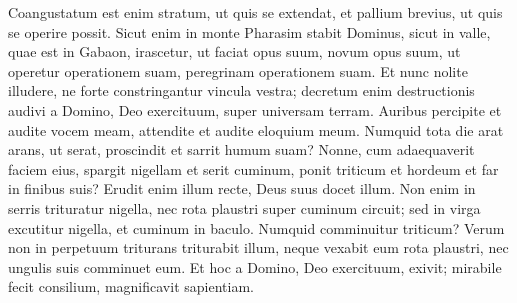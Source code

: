 \begin{biblechapter}
\verse Coangustatum est enim stratum, ut quis se extendat, et pallium brevius, ut quis se operire possit. 
\verse Sicut enim in monte Pharasim stabit Dominus, sicut in valle, quae est in Gabaon, irascetur, ut faciat opus suum, novum opus suum, ut operetur operationem suam, peregrinam operationem suam. 
\verse Et nunc nolite illudere, ne forte constringantur vincula vestra; decretum enim destructionis audivi a Domino, Deo exercituum, super universam terram. 
\verse Auribus percipite et audite vocem meam, attendite et audite eloquium meum. 
\verse Numquid tota die arat arans, ut serat, proscindit et sarrit humum suam? 
\verse Nonne, cum adaequaverit faciem eius, spargit nigellam et serit cuminum, ponit triticum et hordeum et far in finibus suis? 
\verse Erudit enim illum recte, Deus suus docet illum. 
\verse Non enim in serris trituratur nigella, nec rota plaustri super cuminum circuit; sed in virga excutitur nigella, et cuminum in baculo. 
\verse Numquid comminuitur triticum? Verum non in perpetuum triturans triturabit illum, neque vexabit eum rota plaustri, nec ungulis suis comminuet eum. 
\verse Et hoc a Domino, Deo exercituum, exivit; mirabile fecit consilium, magnificavit sapientiam. 
\end{biblechapter}

